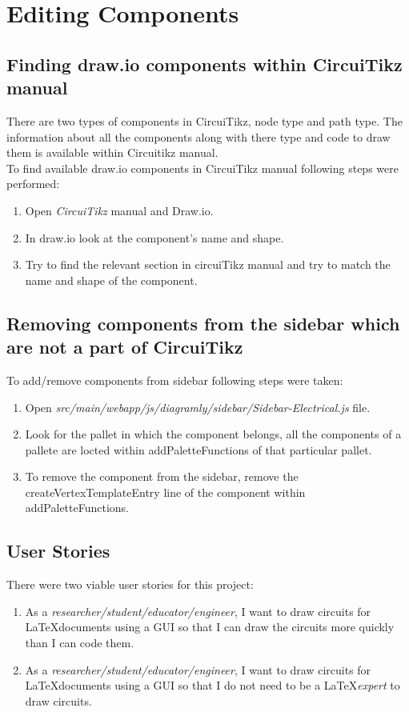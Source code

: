 %
\chapter{Editing Components}\label{ch:editing-components}

\section{Finding draw.io components within CircuiTikz manual}
There are two types of components in CircuiTikz, node type and path type. The information about all the components along with there type and code to draw them is available within Circuitikz manual.\\
To find available draw.io components in CircuiTikz manual following steps were performed:
\begin{enumerate}
    \item Open \emph{CircuiTikz} manual and Draw.io.
    \item In draw.io look at the component's name and shape.
    \item Try to find the relevant section in circuiTikz manual and try to match the name and shape of the component.
\end{enumerate}

\section{Removing components from the sidebar which are not a part of CircuiTikz}
To add/remove components from sidebar following steps were taken:
\begin{enumerate}
    \item Open \emph{src/main/webapp/js/diagramly/sidebar/Sidebar-Electrical.js} file.
    \item Look for the pallet in which the component belongs, all the components of a pallete are locted within addPaletteFunctions of that particular pallet.
    \item To remove the component from the sidebar, remove the createVertexTemplateEntry line of the component within addPaletteFunctions.
\end{enumerate}


\section{User Stories}\label{sec:user-stories}
There were two viable user stories for this project:
\begin{enumerate}
    \item As a \emph{researcher/student/educator/engineer}, I want to draw circuits for \LaTeX documents using a GUI so that I can draw the circuits more quickly than I can code them.
    \item As a \emph{researcher/student/educator/engineer}, I want to draw circuits for \LaTeX documents using a GUI so that I do not need to be a \LaTeX \emph{expert} to draw circuits.
\end{enumerate}

